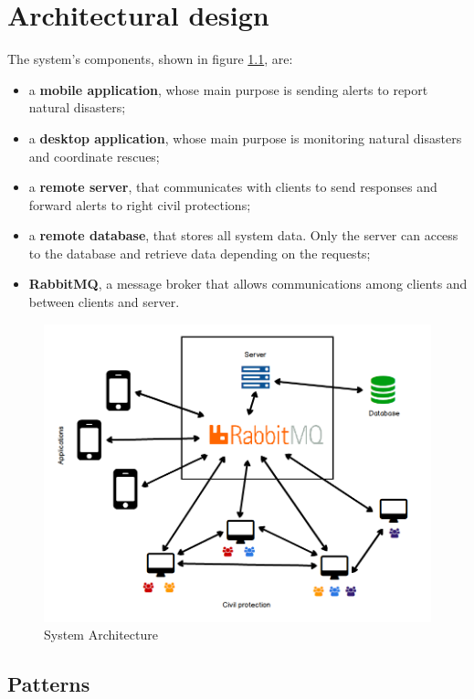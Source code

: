 \documentclass[a4paper,12pt]{report}
\begin{document}
\chapter{Architectural design}

The system's components, shown in figure \ref{fig:ArchDesign}, are:

\begin{itemize}
\item a \textbf{mobile application}, whose main purpose is sending alerts to report natural disasters;
\item a \textbf{desktop application}, whose main purpose is monitoring natural disasters and coordinate rescues;
\item a \textbf{remote server}, that communicates with clients to send responses and forward alerts to right civil protections;
\item a \textbf{remote database}, that stores all system data. Only the server can access to the database and retrieve data depending on the requests;
\item \textbf{RabbitMQ}, a message broker that allows communications among clients and between clients and server.
\end{itemize}

\begin{figure}[ht]
\centering
\includegraphics[width=\textwidth]{figures/BaseArchitecture.png}
\caption{System Architecture}
\label{fig:ArchDesign}
\end{figure}

\section{Patterns}
\end{document}
